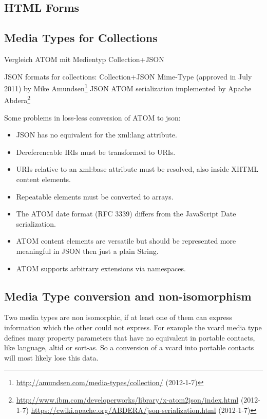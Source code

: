 \documentclass[12pt,a4paper]{scrartcl}		%
\newcommand{\citeurl}[2]{\url{#1} (#2)}
\begin{document}
\subsection{HTML Forms}
\label{sec:html-forms}

\subsection{Media Types for Collections}
\label{sec:media-types-coll}
Vergleich ATOM mit Medientyp Collection+JSON

JSON formats for collections:
Collection+JSON Mime-Type (approved in July 2011) by Mike Amundsen\footnote{\citeurl{http://amundsen.com/media-types/collection/}{2012-1-7}}
JSON ATOM serialization implemented by Apache Abdera\footnote{\citeurl{http://www.ibm.com/developerworks/library/x-atom2json/index.html}{2012-1-7} \citeurl{https://cwiki.apache.org/ABDERA/json-serialization.html}{2012-1-7}}


Some problems in loss-less conversion of ATOM to json:\cite{Snell2008}
\begin{itemize}
  \item JSON has no equivalent for the xml:lang attribute.
  \item Dereferencable IRIs must be transformed to URIs.
  \item URIs relative to an xml:base attribute must be resolved, also inside XHTML content elements.
  \item Repeatable elements must be converted to arrays.
  \item The ATOM date format (RFC 3339) differs from the JavaScript Date serialization.
  \item ATOM content elements are versatile but should be represented more meaningful in JSON then just a plain String.
  \item ATOM supports arbitrary extensions via namespaces.
\end{itemize}


\subsection{Media Type conversion and non-isomorphism}

Two media types are non isomorphic, if at least one of them can express
information which the other could not express. For example the vcard media type
defines many property parameters that have no equivalent in portable contacts,
like language, altid or sort-as. So a conversion of a vcard into portable
contacts will most likely lose this data.
\end{document}
